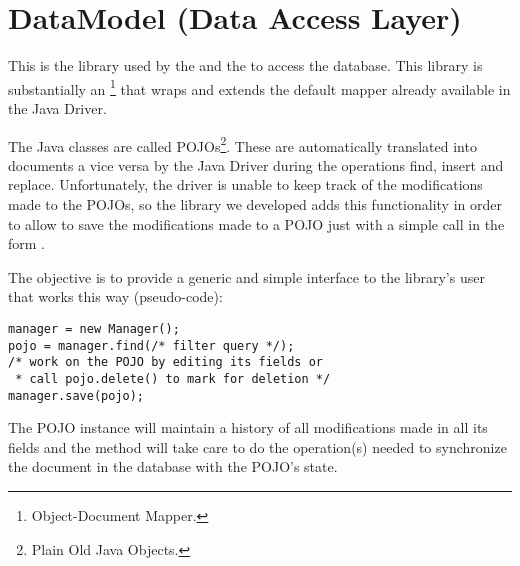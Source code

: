 \section{DataModel (Data Access Layer)}\label{sec:datamodel}

This is the library used by the  and the  to access
the database. This library is substantially an
\footnote{Object-Document Mapper.} that wraps and extends the
default mapper already available in the \mongodb{} Java Driver.

The Java classes are called POJOs\footnote{Plain Old Java Objects.}. These are
automatically translated into documents a vice versa by the \mongodb{} Java
Driver during the operations find, insert and replace. Unfortunately, the driver
is unable to keep track of the modifications made to the POJOs, so the library
we developed adds this functionality in order to allow to save the modifications
made to a POJO just with a simple call in the form .

The objective is to provide a generic and simple interface to the library's
user that works this way (pseudo-code):
\begin{verbatim}
manager = new Manager();
pojo = manager.find(/* filter query */);
/* work on the POJO by editing its fields or
 * call pojo.delete() to mark for deletion */
manager.save(pojo);
\end{verbatim}
The POJO instance will maintain a history of all modifications made in all its
fields and the  method will take care to do the
operation(s) needed to synchronize the document in the database with the POJO's
state.

